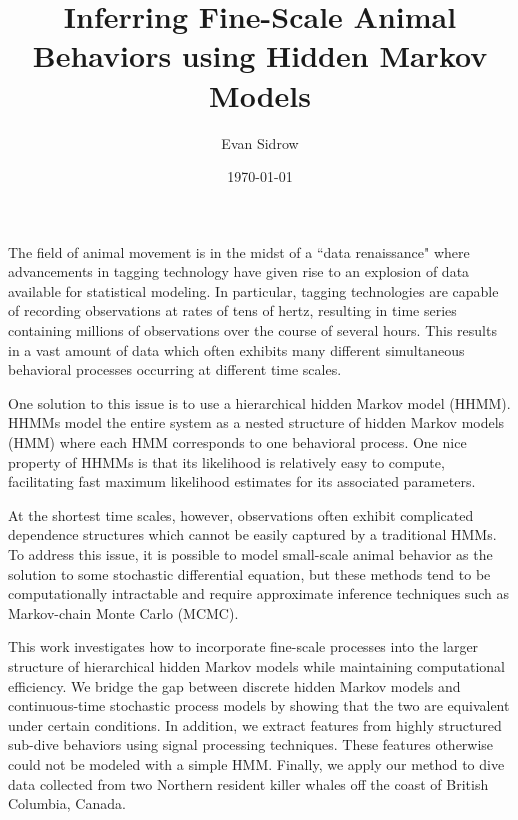 \documentclass[10pt]{article}
\title{Inferring Fine-Scale Animal Behaviors using Hidden Markov Models}
\author{Evan Sidrow}
\date{\today}
\begin{document}
\maketitle

\abstract

The field of animal movement is in the midst of a ``data renaissance" where advancements in tagging technology have given rise to an explosion of data available for statistical modeling. In particular, tagging technologies are capable of recording observations at rates of tens of hertz, resulting in time series containing millions of observations over the course of several hours. This results in a vast amount of data which often exhibits many different simultaneous behavioral processes occurring at different time scales. 

One solution to this issue is to use a hierarchical hidden Markov model (HHMM). HHMMs model the entire system as a nested structure of hidden Markov models (HMM) where each HMM corresponds to one behavioral process. One nice property of HHMMs is that its likelihood is relatively easy to compute, facilitating fast maximum likelihood estimates for its associated parameters.  

At the shortest time scales, however, observations often exhibit complicated dependence structures which cannot be easily captured by a traditional HMMs. To address this issue, it is possible to model small-scale animal behavior as the solution to some stochastic differential equation, but these methods tend to be computationally intractable and require approximate inference techniques such as Markov-chain Monte Carlo (MCMC).

This work investigates how to incorporate fine-scale processes into the larger structure of hierarchical hidden Markov models while maintaining computational efficiency. We bridge the gap between discrete hidden Markov models and continuous-time stochastic process models by showing that the two are equivalent under certain conditions. In addition, we extract features from highly structured sub-dive behaviors using signal processing techniques. These features otherwise could not be modeled with a simple HMM. Finally, we apply our method to dive data collected from two Northern resident killer whales off the coast of British Columbia, Canada.

%







\newpage




\newpage


\end{document}
